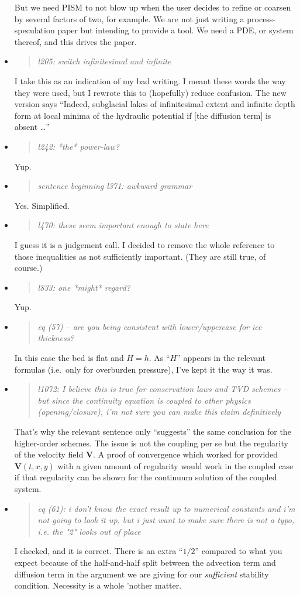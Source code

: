 \documentclass[11pt,reqno]{amsart}
\newcommand{\reply}[2]{
\medskip\medskip
\item  \begin{quote}
\emph{#1}
\end{quote}

\medskip
\noindent #2}
\begin{document}
\begin{itemize}
{\medskip
But we need PISM to not blow up when the user decides to refine or coarsen by several factors of two, for example.  We are not just writing a process-speculation paper but intending to provide a tool.  We need a PDE, or system thereof, and this drives the paper.}

\reply{l205: switch infinitesimal and infinite}{I take this as an indication of my bad writing.  I meant these words the way they were used, but I rewrote this to (hopefully) reduce confusion.  The new version says ``Indeed, subglacial lakes of infinitesimal extent and infinite depth form at local minima of the hydraulic potential if [the diffusion term] is absent \dots''}

\reply{l242: *the* power-law?}{Yup.}

\reply{sentence beginning l371: awkward grammar}{Yes.  Simplified.}

\reply{l470: these seem important enough to state here}{I guess it is a judgement call.  I decided to remove the whole reference to those inequalities as not sufficiently important.  (They are still true, of course.)}

\reply{l833: one *might* regard?}{Yup.}

\reply{eq (57) -- are you being consistent with lower/uppercase for ice thickness?}{In this case the bed is flat and $H=h$.  As ``$H$'' appears in the relevant formulas (i.e.~only for overburden pressure), I've kept it the way it was.}

\newcommand{\bV}{\mathbf{V}}
\reply{l1072: I believe this is true for conservation laws and TVD schemes -- but since the continuity equation is coupled to other physics (opening/closure), i'm not sure you can make this claim definitively}{That's why the relevant sentence only ``suggests'' the same conclusion for the higher-order schemes.  The issue is not the coupling per se but the regularity of the velocity field $\bV$.  A proof of convergence which worked for provided $\bV(t,x,y)$ with a given amount of regularity would work in the coupled case if that regularity can be shown for the continuum solution of the coupled system.}

\reply{eq (61): i don't know the exact result up to numerical constants and i'm not going to look it up, but i just want to make sure there is not a typo, i.e. the "2" looks out of place}{I checked, and it is correct.  There is an extra ``$1/2$'' compared to what you expect because of the half-and-half split between the advection term and diffusion term in the argument we are giving for our \emph{sufficient} stability condition.  Necessity is a whole 'nother matter.}


\end{itemize}
\end{document}
